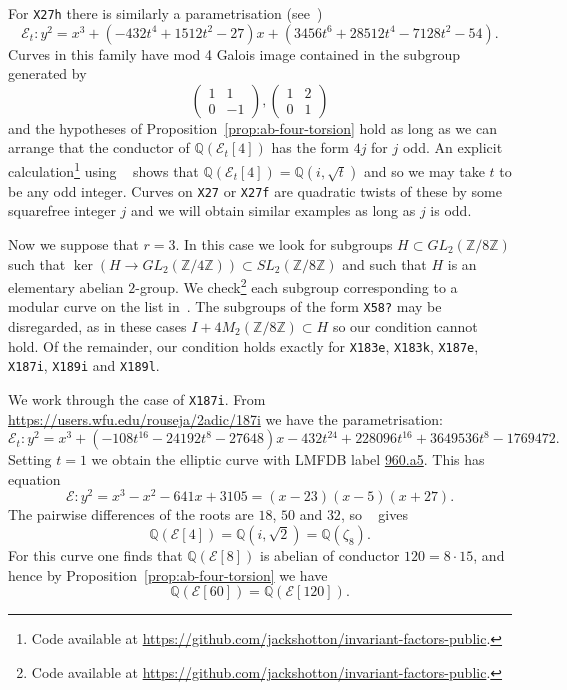 \documentclass{amsart}
\theoremstyle{plain}
\theoremstyle{remark}
\newcommand{\Q}{\mathbb{Q}}
\newcommand{\Z}{\mathbb{Z}}
\newcommand{\E}{\mathcal{E}}
\begin{document}
  For \texttt{X27h} there is similarly a parametrisation (see~\cite[Section~6.2]{gonzalez-jimenezEllipticCurvesAbelian2016})
  \[\E_t : y^2 = x^3 + (-432t^4 + 1512t^2 - 27)x + (3456t^6 + 28512t^4 - 7128t^2 - 54).\]
  Curves in this family have mod 4 Galois image contained in the subgroup generated by
\[
    \begin{pmatrix}
      1 & 1 \\
      0 & -1
    \end{pmatrix},
    \begin{pmatrix}
      1 & 2 \\
      0 & 1
    \end{pmatrix}
  \]
  and the hypotheses of Proposition~\ref{prop:ab-four-torsion} hold as long as we can arrange that the conductor of
  $\Q(\E_t[4])$ has the form $4j$ for $j$ odd. An explicit calculation\footnote{Code available at \url{https://github.com/jackshotton/invariant-factors-public}.} using
  ~\cite[Corollary~2.5]{gonzalez-jimenezEllipticCurvesAbelian2016} shows that $\Q(\E_t[4]) = \Q(i, \sqrt{t})$ and so we
  may take $t$ to be any odd integer. Curves on \texttt{X27} or \texttt{X27f} are quadratic twists of these by some
  squarefree integer $j$ and we will obtain similar examples as long as $j$ is odd.

  Now we suppose that $r = 3$. In this case we look for subgroups $H \subset GL_2(\Z/8\Z)$ such that
  $\ker(H \to GL_2(\Z/4\Z)) \subset SL_2(\Z/8\Z)$ and such that $H$ is an elementary abelian $2$-group. We
  check\footnote{Code available at \url{https://github.com/jackshotton/invariant-factors-public}.} each
  subgroup corresponding to a modular curve on the list in~\cite[Table
  4]{gonzalez-jimenezEllipticCurvesAbelian2016}. The subgroups of the form
  \texttt{X58?} may be disregarded, as in these cases $I + 4 M_2(\Z/8\Z) \subset H$ so our condition cannot hold. Of the
  remainder, our condition holds exactly for \texttt{X183e}, \texttt{X183k}, \texttt{X187e}, \texttt{X187i},
  \texttt{X189i} and \texttt{X189l}.

  We work through the case of \texttt{X187i}. From \url{https://users.wfu.edu/rouseja/2adic/187i} we have the
  parametrisation:
   \[
  \E_t : y^2 = x^3 + \left(-108t^{16} - 24192t^8 - 27648\right)x - 432t^{24} + 228096t^{16} + 3649536t^8 - 1769472.
  \]
  Setting $t = 1$ we obtain the elliptic curve with LMFDB label
  \href{https://www.lmfdb.org/EllipticCurve/Q/960/a/5}{960.a5}. This has equation
  \[
    \E : y^2 = x^3 - x^2 - 641x + 3105 = (x-23)(x-5)(x+27).
  \]
  The pairwise differences of the roots are $18$, $50$ and $32$, so
  ~\cite[Corollary~2.5]{gonzalez-jimenezEllipticCurvesAbelian2016} gives
  \[
    \Q(\E[4]) = \Q(i,\sqrt{2}) = \Q(\zeta_8).
  \]
  For this curve one finds that $\Q(\E[8])$ is abelian of conductor $120 = 8\cdot 15$, and hence by Proposition~\ref{prop:ab-four-torsion} we have
  \[
    \Q(\E[60]) = \Q(\E[120]).
  \]
\end{document}
